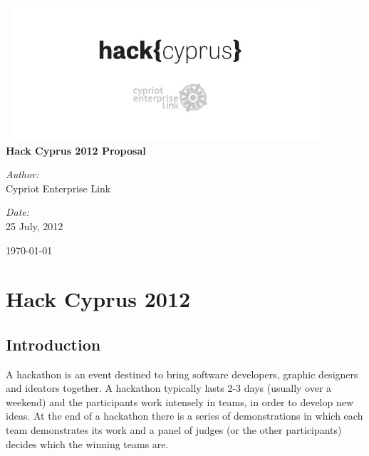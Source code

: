 \documentclass[a4paper,11pt]{report}
\begin{document}
\begin{titlepage}
\begin{center}
\includegraphics[height=5cm, width=0.9\textwidth]{cel}\\[1cm]    
{ \huge \bfseries Hack Cyprus 2012 Proposal}\\[0.4cm]
\begin{minipage}{0.4\textwidth}
\begin{flushleft} \large
\emph{Author:}\\
Cypriot Enterprise Link
\end{flushleft}
\end{minipage}
\begin{minipage}{0.4\textwidth}
\begin{flushright} \large
\emph{Date:} \\
25 July, 2012
\end{flushright}
\end{minipage}
\vfill
{\large \today}
\end{center}
\end{titlepage}



\tableofcontents
\chapter{Hack Cyprus 2012}
\section{Introduction}
A hackathon is an event destined to bring software developers, graphic designers and ideators together. A hackathon typically lasts 2-3 days (usually over a weekend) and the participants work intensely in teams, in order to develop new ideas. At the end of a hackathon there is a series of demonstrations in which each team demonstrates its work and a panel of judges (or the other participants) decides which the winning teams are.
\end{document}
